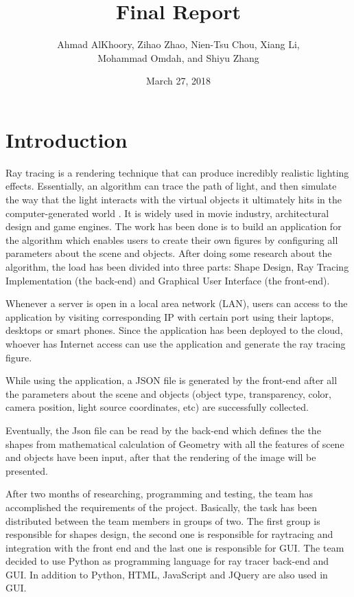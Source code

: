 \documentclass[a4paper, 12pt]{article}
\title{Final Report}
\author{Ahmad AlKhoory, Zihao Zhao, Nien-Tsu Chou, Xiang Li,\\Mohammad Omdah, and Shiyu Zhang}
\date{March 27, 2018}
\begin{document}
\maketitle


\section{Introduction}
Ray tracing is a rendering technique that can produce incredibly realistic lighting effects. Essentially, an algorithm can trace the path of light, and then simulate the way that the light interacts with the virtual objects it ultimately hits in the computer-generated world \cite{Ray tracing}. It is widely used in movie industry, architectural design and game engines. The work has been done is to build an application for the algorithm which enables users to create their own figures by configuring all parameters about the scene and objects. After doing some research about the algorithm, the load has been divided into three parts: Shape Design, Ray Tracing Implementation (the back-end) and Graphical User Interface (the front-end).

Whenever a server is open in a local area network (LAN), users can access to the application by visiting corresponding IP with certain port using their laptops, desktops or smart phones. Since the application has been deployed to the cloud, whoever has Internet access can use the application and generate the ray tracing figure.

While using the application, a JSON file is generated by the front-end after all the parameters about the scene and objects (object type, transparency, color, camera position, light source coordinates, etc) are successfully collected.

Eventually, the Json file can be read by the back-end which defines the the shapes from mathematical calculation of Geometry with all the features of scene and objects have been input, after that the rendering of the image will be presented.

After two months of researching, programming and testing, the team has accomplished the requirements of the project. Basically, the task has been distributed between the team members in groups of two. The first group is responsible for shapes design, the second one is responsible for raytracing and integration with the front end and the last one is responsible for GUI. The team decided to use Python as programming language for ray tracer back-end and GUI. In addition to Python, HTML, JavaScript and JQuery are also used in GUI. 
\end{document}
